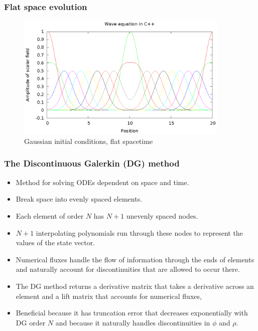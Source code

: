 \documentclass{beamer}
\begin{document}
\begin{frame}
  \frametitle{Flat space evolution}
  \begin{figure}
    \includegraphics[width=4.0in]{gaussWave}
    \caption{Gaussian initial conditions, flat spacetime}
  \end{figure}
\end{frame}



\begin{frame}
  \frametitle{The Discontinuous Galerkin (DG) method}
  \begin{itemize}
  \item Method for solving ODEs dependent on space and time.
  \item Break space into evenly spaced elements.
  \item Each element of order $N$ has $N+1$ unevenly spaced nodes.
  \item $N+1$ interpolating polynomials run through these nodes to represent the values of the state vector.
  \item Numerical fluxes handle the flow of information through the ends of elements and naturally account for discontinuities that are allowed to occur there.
  \item The DG method returns a derivative matrix that takes a derivative across an element and a lift matrix that accounts for numerical fluxes,
  \item Beneficial because it has truncation error that decreases exponentially with DG order $N$ and because it naturally handles discontinuities in $\phi$ and $\rho$. 
  \end{itemize}
\end{frame}
\end{document}
